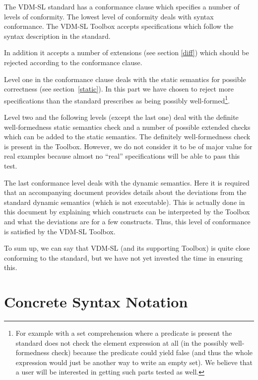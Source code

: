 \documentclass[\pformat,12pt]{article}
\newcommand{\vdmslpp}[2]{%
#1
}
\newcommand{\vdmsl}{VDM-SL}
\newcommand{\vdmpp}{VDM++}
\begin{document}
The VDM-SL standard has a conformance clause which specifies a number
of levels of conformity. The lowest level of conformity deals with
syntax conformance. The  \vdmslpp{\vdmsl}{\vdmpp} Toolbox accepts
specifications which follow the syntax description in the
\vdmslpp{standard.}{standard with the exceptions described in section
\ref{diff}.}

In addition it accepts a number of extensions (see section \ref{diff})
which should be rejected according to the conformance clause.

Level one in the conformance clause deals with the static semantics
for possible correctness (see section~\ref{static}). 
In this part we have chosen to reject more
specifications than the standard prescribes as being possibly
well-formed\footnote{For example with a set comprehension where a
  predicate is present the standard does not check the element
  expression at all (in the possibly well-formedness check) because
  the predicate could yield false (and thus the whole expression would
  just be another way to write an empty set). We believe that a user
  will be interested in getting such parts tested as well.}.

Level two and the following levels (except the last one) deal with the
definite well-formedness static semantics check and a number of
possible extended checks which can be added to the static semantics.
The definitely well-formedness check is present in the
Toolbox. However, we do not consider it to be of major value for real
examples because almost no ``real'' specifications will be able to
pass this test.

The last conformance level deals with the dynamic semantics. Here it
is required that an accompanying document provides details about the
deviations from the standard dynamic semantics (which is not
executable). This is actually done in this document by explaining
which constructs can be interpreted by the Toolbox and what the
deviations are for a few constructs. Thus, this level of conformance
is satisfied by the  \vdmslpp{VDM-SL}{\vdmpp} Toolbox.

To sum up, we can say that  \vdmslpp{VDM-SL}{\vdmpp} (and its
supporting Toolbox) is quite close conforming to the standard, but we
have not yet invested the time in ensuring this.

\section{Concrete Syntax Notation}
\label{syntax-notation}
\end{document}
